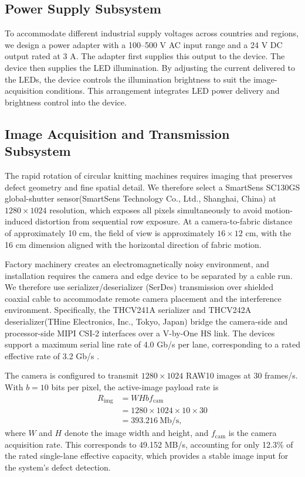 \documentclass[journal]{IEEEtran}
\begin{document}
\subsection{Power Supply Subsystem}
To accommodate different industrial supply voltages across countries and regions, we design a power adapter with a 100--500 V AC input range and a 24 V DC output rated at 3 A. The adapter first supplies this output to the device. The device then supplies the LED illumination. By adjusting the current delivered to the LEDs, the device controls the illumination brightness to suit the image-acquisition conditions. This arrangement integrates LED power delivery and brightness control into the device.

\subsection{Image Acquisition and Transmission Subsystem}
The rapid rotation of circular knitting machines requires imaging that preserves defect geometry and fine spatial detail. We therefore select a  SmartSens SC130GS global-shutter sensor(SmartSens Technology Co., Ltd., Shanghai, China) at $1280\times1024$ resolution, which exposes all pixels simultaneously to avoid motion-induced distortion from sequential row exposure. At a camera-to-fabric distance of approximately 10 cm, the field of view is approximately $16\times12$ cm, with the 16 cm dimension aligned with the horizontal direction of fabric motion.

Factory machinery creates an electromagnetically noisy environment, and installation requires the camera and edge device to be separated by a cable run. We therefore use serializer/deserializer (SerDes) transmission over shielded coaxial cable to accommodate remote camera placement and the interference environment. Specifically, the THCV241A serializer and THCV242A deserializer(THine Electronics, Inc., Tokyo, Japan) bridge the camera-side and processor-side MIPI CSI-2 interfaces over a V-by-One HS link. The devices support a maximum serial line rate of 4.0 Gb/s per lane, corresponding to a rated effective rate of 3.2 Gb/s \cite{thineTHCV241A,thineTHCV242A}.

The camera is configured to transmit $1280\times1024$ RAW10 images at 30 frames/s. With $b=10$ bits per pixel, the active-image payload rate is
\begin{equation}
\begin{aligned}
R_{\mathrm{img}} &= W H b f_{\mathrm{cam}} \\
&=1280\times1024\times10\times30 \\
&=393.216\ \mathrm{Mb/s},
\end{aligned}
\label{eq:serdes-bandwidth}
\end{equation}
where $W$ and $H$ denote the image width and height, and $f_{\mathrm{cam}}$ is the camera acquisition rate. This corresponds to 49.152 MB/s, accounting for only 12.3\% of the rated single-lane effective capacity, which provides a stable image input for the system's defect detection.
\end{document}

